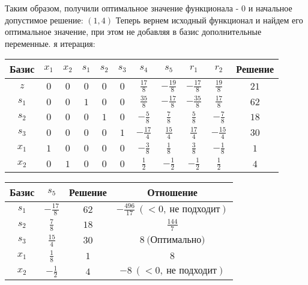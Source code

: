 \documentclass{article}%
\begin{document}
\begin{flushleft}
\newline%
Таким образом, получили оптимальное значение функционала {-} 0 и начальное допустимое решение: %
$(1, 4)$%
\newline%
Теперь вернем исходный функционал и найдем его оптимальное значение, при этом не добавляя в базис дополнительные переменные.%
я итерация: %
\newline%
\newline%
\renewcommand{\arraystretch}{1.3}%
\begin{tabular}{|c|ccccccccc|c|}%
\hline%
Базис&$x_{1}$&$x_{2}$&$s_{1}$&$s_{2}$&$s_{3}$&$s_{4}$&$s_{5}$&$r_{1}$&$r_{2}$&Решение\\%
\hline%
$z$&$0$&$0$&$0$&$0$&$0$&$\frac{17}{8}$&$-\frac{19}{8}$&$-\frac{17}{8}$&$\frac{19}{8}$&$21$\\%
\hline%
$s_{1}$&$0$&$0$&$1$&$0$&$0$&$\frac{35}{8}$&$-\frac{17}{8}$&$-\frac{35}{8}$&$\frac{17}{8}$&$62$\\%
$s_{2}$&$0$&$0$&$0$&$1$&$0$&$-\frac{5}{8}$&$\frac{7}{8}$&$\frac{5}{8}$&$-\frac{7}{8}$&$18$\\%
$s_{3}$&$0$&$0$&$0$&$0$&$1$&$-\frac{17}{4}$&$\frac{15}{4}$&$\frac{17}{4}$&$-\frac{15}{4}$&$30$\\%
$x_{1}$&$1$&$0$&$0$&$0$&$0$&$-\frac{3}{8}$&$\frac{1}{8}$&$\frac{3}{8}$&$-\frac{1}{8}$&$1$\\%
$x_{2}$&$0$&$1$&$0$&$0$&$0$&$\frac{1}{2}$&$-\frac{1}{2}$&$-\frac{1}{2}$&$\frac{1}{2}$&$4$\\%
\hline%
\end{tabular}%
\newline%
\newline%
\newline%
\begin{tabular}{|cccc|}%
\hline%
Базис&$s_{5}$&Решение&Отношение\\%
\hline%
$s_{1}$&$-\frac{17}{8}$&$62$&$-\frac{496}{17}\: (< 0, \: \text{не подходит})$\\%
$s_{2}$&$\frac{7}{8}$&$18$&$\frac{144}{7}$\\%
$s_{3}$&$\frac{15}{4}$&$30$&$8\: \text{(Оптимально)}$\\%
$x_{1}$&$\frac{1}{8}$&$1$&$8$\\%
$x_{2}$&$-\frac{1}{2}$&$4$&$-8\: (< 0, \: \text{не подходит})$\\%
\hline%
\end{tabular}%
\newline%
\newline%
\newline%

\end{flushleft}
\end{document}
